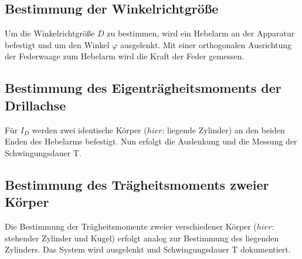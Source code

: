 \subsection{Bestimmung der Winkelrichtgröße}
\label{sec:Durchführung}
Um die Winkelrichtgröße $D$ zu bestimmen, wird ein Hebelarm an der Apparatur
befestigt und um den Winkel $\varphi$ ausgelenkt. Mit einer orthogonalen
Ausrichtung der Federwaage zum Hebelarm wird die Kraft der Feder
gemessen.
\subsection{Bestimmung des Eigenträgheitsmoments der Drillachse}
\label{sec:Durchführung}
Für $I_D$ werden zwei identische Körper ($hier$: liegende Zylinder) an den
beiden Enden des Hebelarms befestigt. Nun erfolgt die Auslenkung und die
Messung der Schwingungsdauer T.
\subsection{Bestimmung des Trägheitsmoments zweier Körper}
\label{sec:zwei körper}
Die Bestimmung der Trägheitsmomente zweier verschiedener Körper ($hier$:
stehender Zylinder und Kugel) erfolgt analog zur Bestimmung des liegenden
Zylinders. Das System wird ausgelenkt und Schwingungsdauer T dokumentiert.
